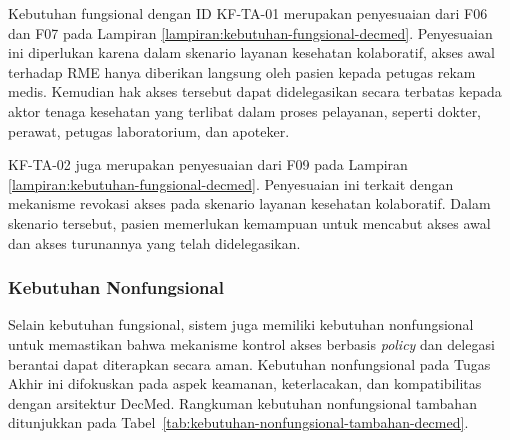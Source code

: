 Kebutuhan fungsional dengan ID KF-TA-01 merupakan penyesuaian dari F06 dan F07 pada Lampiran \ref{lampiran:kebutuhan-fungsional-decmed}. Penyesuaian ini diperlukan karena dalam skenario layanan kesehatan kolaboratif, akses awal terhadap RME hanya diberikan langsung oleh pasien kepada petugas rekam medis. Kemudian hak akses tersebut dapat didelegasikan secara terbatas kepada aktor tenaga kesehatan yang terlibat dalam proses pelayanan, seperti dokter, perawat, petugas laboratorium, dan apoteker.

KF-TA-02 juga merupakan penyesuaian dari F09 pada Lampiran \ref{lampiran:kebutuhan-fungsional-decmed}. Penyesuaian ini terkait dengan mekanisme revokasi akses pada skenario layanan kesehatan kolaboratif. Dalam skenario tersebut, pasien memerlukan kemampuan untuk mencabut akses awal dan akses turunannya yang telah didelegasikan.

\subsubsection{Kebutuhan Nonfungsional}
\label{subsubsec:kebutuhan-nonfungsional}

Selain kebutuhan fungsional, sistem juga memiliki kebutuhan nonfungsional untuk memastikan bahwa mekanisme kontrol akses berbasis \textit{policy} dan delegasi berantai dapat diterapkan secara aman. Kebutuhan nonfungsional pada Tugas Akhir ini difokuskan pada aspek keamanan, keterlacakan, dan kompatibilitas dengan arsitektur DecMed. Rangkuman kebutuhan nonfungsional tambahan ditunjukkan pada Tabel~\ref{tab:kebutuhan-nonfungsional-tambahan-decmed}.

